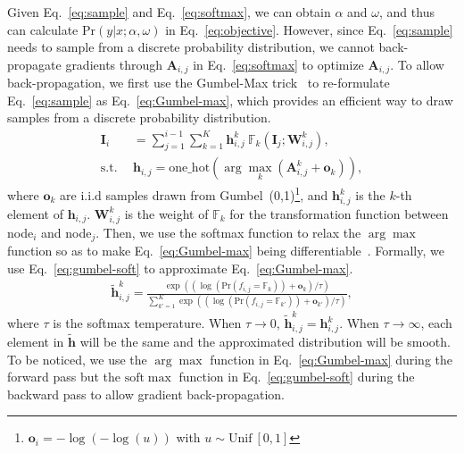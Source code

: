 \documentclass[10pt,twocolumn,letterpaper]{article}
\def\Eqref#1{Eq.~\eqref{#1}}
\def\vh{{\bm{h}}}
\def\vo{{\bm{o}}}
\def\mA{{\bm{A}}}
\def\mI{{\bm{I}}}
\def\mW{{\bm{W}}}
\def\sF{{\mathbb{F}}}
\begin{document}
Given \Eqref{eq:sample} and \Eqref{eq:softmax}, we can obtain $\alpha$ and $\omega$, and thus can calculate $\mathrm{Pr}(y|x; \alpha, \omega)$ in \Eqref{eq:objective}.
However, since \Eqref{eq:sample} needs to sample from a discrete probability distribution, we cannot back-propagate gradients through $\mA_{i,j}$ in \Eqref{eq:softmax} to optimize $\mA_{i,j}$.
To allow back-propagation, we first use the Gumbel-Max trick~\cite{gumbel1954statistical,maddison2014sampling} to re-formulate \Eqref{eq:sample} as \Eqref{eq:Gumbel-max}, which provides an efficient way to draw samples from a discrete probability distribution.
\begin{align}
  \mI_{i}      ~&~ = \sum_{j=1}^{i-1} \sum_{k=1}^{K} {\vh_{i,j}^{k}}~\sF_{k} ( \mI_{j}; \mW_{i,j}^{k} ) , \label{eq:Gumbel-max}\\
  \mathrm{s.t.}~&~ {\vh_{i,j}} = \mathrm{one\_hot}(\arg\max_{k}( \mA_{i,j}^{k} + \vo_{k} ) ), \label{eq:one-hot}
\end{align}
\noindent where $\vo_{k}$ are i.i.d samples drawn from Gumbel~(0,1)\footnote{$\vo_{i}=-\log(-\log(u))$ with $u\sim\mathrm{Unif~[0,1]}$}, and
$\vh_{i,j}^{k}$ is the $k$-th element of $\vh_{i,j}$.
$\mW_{i,j}^{k}$ is the weight of $\sF_{k}$ for the transformation function between node$_i$ and node$_j$.
Then, we use the softmax function to relax the $\arg\max$ function so as to make \Eqref{eq:Gumbel-max} being differentiable~\cite{jang2017categorical,maddison2017concrete}.
Formally, we use \Eqref{eq:gumbel-soft} to approximate \Eqref{eq:Gumbel-max}.
\begin{align}\label{eq:gumbel-soft}
\tilde{\vh}_{i,j}^{k} = \frac{\exp((\log(\mathrm{Pr}(f_{i,j}=\sF_{k})) + \vo_{k}) / \tau)}{ \sum_{k'=1}^{K} \exp( (\log(\mathrm{Pr}(f_{i,j}=\sF_{k'})) + \vo_{k'}) /\tau ) } ,
\end{align}
\noindent where $\tau$ is the softmax temperature.
When $\tau \rightarrow 0$, $\tilde{\vh}_{i,j}^{k} = {\vh}_{i,j}^{k}$.
When $\tau \rightarrow \infty$, each element in $\tilde{\vh}$ will be the same and the approximated distribution will be smooth.
To be noticed, we use the $\arg\max$ function in \Eqref{eq:Gumbel-max} during the forward pass but the $\mathrm{soft}\max$ function in \Eqref{eq:gumbel-soft} during the backward pass to allow gradient back-propagation.
\end{document}
